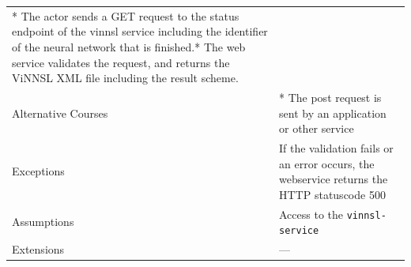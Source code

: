 \begin{longtable}[]{@{}ll@{}}
\begin{minipage}[t]{0.68\columnwidth}
* The actor sends a GET request to the status endpoint of the vinnsl
service including the identifier of the neural network that is
finished.* The web service validates the request, and returns the ViNNSL
XML file including the result scheme.\strut
\end{minipage}\tabularnewline
\begin{minipage}[t]{0.27\columnwidth}\raggedright\strut
Alternative Courses\strut
\end{minipage} & \begin{minipage}[t]{0.68\columnwidth}\raggedright\strut
* The post request is sent by an application or other service\strut
\end{minipage}\tabularnewline
\begin{minipage}[t]{0.27\columnwidth}\raggedright\strut
Exceptions\strut
\end{minipage} & \begin{minipage}[t]{0.68\columnwidth}\raggedright\strut
If the validation fails or an error occurs, the webservice returns the
HTTP statuscode 500\strut
\end{minipage}\tabularnewline
\begin{minipage}[t]{0.27\columnwidth}\raggedright\strut
Assumptions\strut
\end{minipage} & \begin{minipage}[t]{0.68\columnwidth}\raggedright\strut
Access to the \texttt{vinnsl-service}\strut
\end{minipage}\tabularnewline
\begin{minipage}[t]{0.27\columnwidth}\raggedright\strut
Extensions\strut
\end{minipage} & \begin{minipage}[t]{0.68\columnwidth}\raggedright\strut
---\strut
\end{minipage}\tabularnewline
\bottomrule
\end{longtable}

